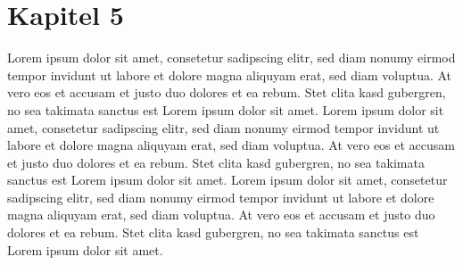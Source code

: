 \chapter{Kapitel 5}
\label{chap:five}
Lorem ipsum dolor sit amet, consetetur sadipscing elitr, sed diam nonumy eirmod tempor invidunt ut labore et dolore magna aliquyam erat, sed diam voluptua. At vero eos et accusam et justo duo dolores et ea rebum. Stet clita kasd gubergren, no sea takimata sanctus est Lorem ipsum dolor sit amet. Lorem ipsum dolor sit amet, consetetur sadipscing elitr, sed diam nonumy eirmod tempor invidunt ut labore et dolore magna aliquyam erat, sed diam voluptua. At vero eos et accusam et justo duo dolores et ea rebum. Stet clita kasd gubergren, no sea takimata sanctus est Lorem ipsum dolor sit amet. Lorem ipsum dolor sit amet, consetetur sadipscing elitr, sed diam nonumy eirmod tempor invidunt ut labore et dolore magna aliquyam erat, sed diam voluptua. At vero eos et accusam et justo duo dolores et ea rebum. Stet clita kasd gubergren, no sea takimata sanctus est Lorem ipsum dolor sit amet.
\endinput 